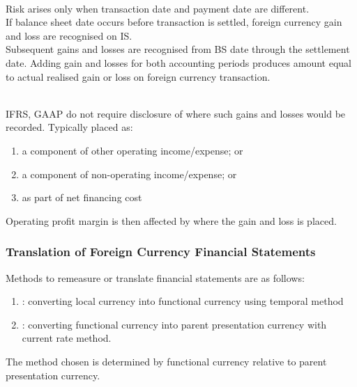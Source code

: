 \begin{definition} \\
Risk arises only when transaction date and payment date are different.\\
If balance sheet date occurs before transaction is settled, foreign currency gain and loss are recognised on IS.\\
Subsequent gains and losses are recognised from BS date through the settlement date. Adding gain and losses for both accounting periods produces amount equal to actual realised gain or loss on foreign currency transaction.
\end{definition}

\begin{remark} \\
IFRS, GAAP do not require disclosure of where such gains and losses would be recorded. Typically placed as:
\begin{enumerate}[label=\roman*.]
\setlength{\itemsep}{0pt}
\item a component of other operating income/expense; or
\item a component of non-operating income/expense; or
\item as part of net financing cost
\end{enumerate}
Operating profit margin is then affected by where the gain and loss is placed.
\end{remark}

\subsubsection{Translation of Foreign Currency Financial Statements}

\begin{method} Methods to remeasure or translate financial statements are as follows:
\begin{enumerate}[label=\roman*.]
\setlength{\itemsep}{0pt}
\item {}: converting local currency into functional currency using temporal method
\item {}: converting functional currency into parent presentation currency with current rate method.
\end{enumerate}
The method chosen is determined by functional currency relative to parent presentation currency.
\end{method}

